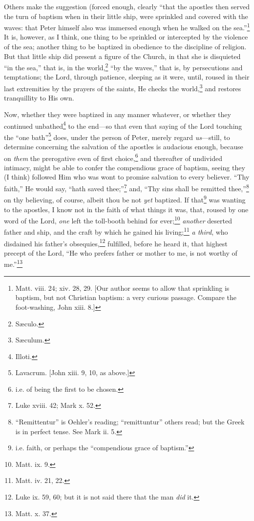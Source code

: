 Others make the suggestion (forced enough, clearly “that the apostles then served the turn of baptism when in their little ship, were sprinkled and covered with the waves: that Peter himself also was immersed enough when he walked on the sea.”\footnote{Matt. viii. 24; xiv. 28, 29. [Our author seems to allow that sprinkling is baptism, but not Christian baptism: a very curious passage. Compare the foot-washing, John xiii. 8.]} It is, however, as I think, one thing to be sprinkled or intercepted by the violence of the sea; another thing to be baptized in obedience to the discipline of religion. But that little ship did present a figure of the Church, in that she is disquieted “in the sea,” that is, in the world,\footnote{Sæculo.} “by the waves,” that is, by persecutions and temptations; the Lord, through patience, sleeping as it were, until, roused in their last extremities by the prayers of the saints, He checks the world,\footnote{Sæculum.} and restores tranquillity to His own.

Now, whether they were baptized in any manner whatever, or whether they continued unbathed\footnote{Illoti.} to the end—so that even that saying of the Lord touching the “one bath”\footnote{Lavacrum. [John xiii. 9, 10, as above.]} does, under the person of Peter, merely regard \emph{us}—still, to determine concerning the salvation of the apostles is audacious enough, because on \emph{them} the prerogative even of first choice,\footnote{i.e. of being the first to be chosen.} and thereafter of undivided intimacy, might be able to confer the compendious grace of baptism, seeing they (I think) followed Him who was wont to promise salvation to every believer. “Thy faith,” He would say, “hath saved thee;”\footnote{Luke xviii. 42; Mark x. 52.} and, “Thy sins shall be remitted thee,”\footnote{“Remittentur” is Oehler’s reading; “remittuntur” others read; but the Greek is in perfect tense. See Mark ii. 5.} on thy believing, of course, albeit thou be not \emph{yet} baptized. If that\footnote{i.e. faith, or perhaps the “compendious grace of baptism.”} was wanting to the apostles, I know not in the faith of what things it was, that, roused by one word of the Lord, \emph{one} left the toll-booth behind for ever;\footnote{Matt. ix. 9.} \emph{another} deserted father and ship, and the craft by which he gained his living;\footnote{Matt. iv. 21, 22.} \emph{a third}, who disdained his father’s obsequies,\footnote{Luke ix. 59, 60; but it is not said there that the man \emph{did} it.} fulfilled, before he heard it, that highest precept of the Lord, “He who prefers father or mother to me, is not worthy of me.”\footnote{Matt. x. 37.}


